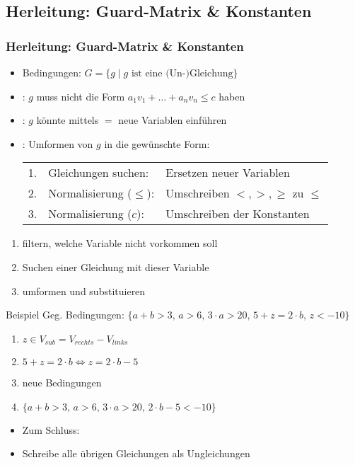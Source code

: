 \subsection{Herleitung: Guard-Matrix \& Konstanten}
\begin{frame}
	\frametitle{Herleitung: Guard-Matrix \& Konstanten}
	\begin{itemize}
		\item Bedingungen: $G=\{g \mid g \text{ ist eine (Un-)Gleichung}\}$
		\item<2-> : $g$ muss nicht die Form $a_1 v_1+\dots +a_n v_n \le c$ haben
		\item<3-> : $g$ k\"onnte mittels \glqq$=$\grqq\xspace neue Variablen einf\"uhren
		\item<4-> : Umformen von $g$ in die gew\"unschte Form: 
			\begin{tabular}{cll}
				1. & Gleichungen suchen:   & Ersetzen \glqq neuer\grqq\xspace Variablen \\
				2. & Normalisierung ($\le$): & Umschreiben $<,>,\ge$ zu $\le$ \\
				3. & Normalisierung ($c$):   & Umschreiben der Konstanten\\
			\end{tabular}
	\end{itemize}	
\end{frame}

\begin{frame}[fragile]
	\begin{enumerate}
		\item filtern, welche Variable nicht vorkommen soll
		\item Suchen einer Gleichung mit dieser Variable
		\item umformen und substituieren
	\end{enumerate}
	\begin{exampleblock}{Beispiel}
		Geg. Bedingungen:
		$\{a + b > 3\text{, } a > 6 \text{, } 3 \cdot  a > 20 \text{, } 5 + z = 2 \cdot  b \text{, } z < -10\}$
		\begin{enumerate}
			\item $z \in V_{sub}=V_{rechts}-V_{links}$
			\item $5+z=2\cdot b \Leftrightarrow z=2\cdot b - 5$
			\item neue Bedingungen
			\item[] $\{a + b > 3\text{, } a > 6 \text{, } 3 \cdot  a > 20 \text{, } 2\cdot b-5 < -10\}$
		\end{enumerate}
	\end{exampleblock}
	\begin{itemize}
		\item[] Zum Schluss: 
		\item[] Schreibe alle \"ubrigen Gleichungen als Ungleichungen
	\end{itemize}
\end{frame}

